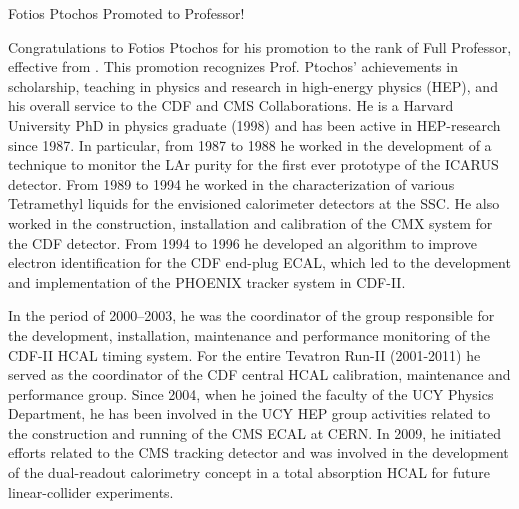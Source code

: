 \begin{headline}[enhanced, tikz={rotate=0}, width=0.48\textwidth]{Fotios Ptochos Promoted to Professor!}
  \begin{multicols}{2}
    Congratulations to Fotios Ptochos for his promotion to the rank of
    Full Professor, effective from \MyDate. This promotion recognizes
    Prof. Ptochos' achievements in scholarship, teaching in physics
    and research in high-energy physics (HEP), and his overall service
    to the CDF and CMS Collaborations. He is a Harvard University PhD
    in physics graduate (1998) and has been active in HEP-research
    since 1987. In particular, from 1987 to 1988 he worked in the
    development of a technique to monitor the LAr purity for the first
    ever prototype of the ICARUS detector. From 1989 to 1994 he worked
    in the characterization of various Tetramethyl liquids for the
    envisioned calorimeter detectors at the SSC. He also
    worked in the construction, installation and calibration of the
    CMX system for the CDF detector. From 1994 to 1996 he developed an algorithm to improve
    electron identification for the CDF end-plug ECAL, which led to
    the development and implementation of the PHOENIX tracker system
    in CDF-II.

    In the period of 2000–2003, he was the coordinator of the group
    responsible for the development, installation, maintenance and
    performance monitoring of the CDF-II HCAL timing system. For the entire Tevatron Run-II
    (2001-2011) he served as the coordinator of the CDF central HCAL
    calibration, maintenance and performance group. Since
    2004, when he joined the faculty of the UCY Physics Department, he has
    been involved in the UCY HEP group activities related to the
    construction and running of the CMS ECAL at CERN. In 2009, he
    initiated efforts related to the CMS tracking detector and was
    involved in the development of the dual-readout calorimetry
    concept in a total absorption HCAL for future linear-collider experiments. 


\end{multicols}
\end{headline}
